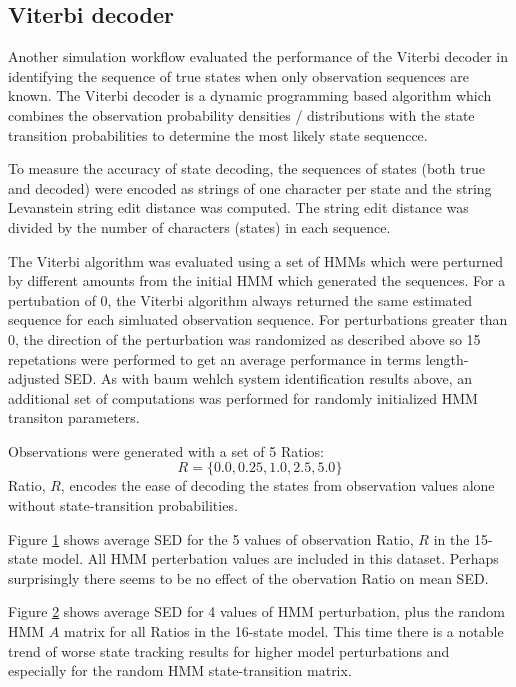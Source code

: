 \subsection{Viterbi decoder}

Another simulation workflow evaluated the performance of the Viterbi decoder in identifying
the sequence of true states when only observation sequences are known.  The Viterbi decoder is a
 dynamic programming based algorithm which combines the observation probability densities / distributions
with the state transition probabilities 
to determine the most likely state sequencce.
 

To measure the accuracy of state decoding, the sequences of states (both true and decoded) were encoded 
as strings of one character per state and the string Levanstein string edit distance was computed.
The string edit distance was divided by the number of characters (states) in each sequence.

The Viterbi algorithm was evaluated using a set of HMMs which were perturned by different amounts from the 
initial HMM which generated the sequences.  For a pertubation of 0, the Viterbi algorithm always returned 
the same estimated sequence for each simluated observation sequence.  
For perturbations greater than 0, the direction of the perturbation was randomized as described above so 
15 repetations were performed to get an average performance in terms length-adjusted SED.
As with baum wehlch system identification results above, 
an additional set of computations was performed for randomly initialized HMM transiton parameters.

Observations were generated with a set of 5 Ratios:
\[
R = \{0.0, 0.25, 1.0, 2.5, 5.0\}
\]
Ratio, $R$, encodes the ease of decoding the states from observation values alone without state-transition
probabilities. 


\begin{figure} 
\caption{}\label{res_SED_v_Ratio_16state}
\end{figure}

Figure \ref{res_SED_v_Ratio_16state} shows average SED for the 5 values of observation Ratio, $R$ in the 15-state model.
All HMM perterbation values are included in this dataset.  Perhaps surprisingly there seems to be no effect of the obervation Ratio on 
mean SED. 


\begin{figure} 
\caption{}\label{res_SED_v_Pert_16state_all}
\end{figure}


Figure \ref{res_SED_v_Pert_16state_all} shows average SED for 4 values of HMM perturbation,  plus the random HMM $A$ matrix for 
all Ratios in the 16-state model.  This time there is a notable trend of worse state tracking results for higher model perturbations 
and especially for the random HMM state-transition matrix. 







